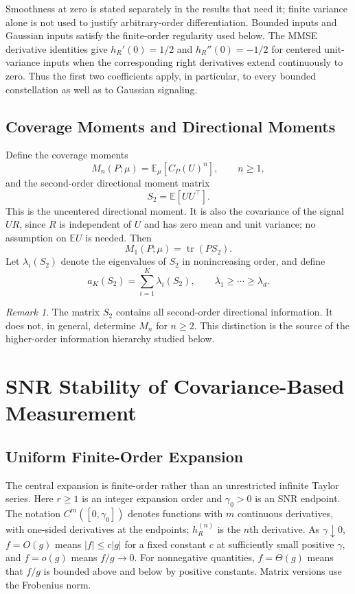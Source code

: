 \documentclass[lettersize,onecolumn]{IEEEtran}
\theoremstyle{remark}
\newtheorem{remark}{Remark}
\theoremstyle{definition}
\newcommand{\EE}{\mathbb E}
\newcommand{\tr}{\operatorname{tr}}
\begin{document}
Smoothness at zero is stated separately in the results that need it; finite variance alone is not used to justify arbitrary-order differentiation. Bounded inputs and Gaussian inputs satisfy the finite-order regularity used below. The MMSE derivative identities \cite{guo2011} give $h_R'(0)=1/2$ and $h_R''(0)=-1/2$ for centered unit-variance inputs when the corresponding right derivatives extend continuously to zero. Thus the first two coefficients apply, in particular, to every bounded constellation as well as to Gaussian signaling.

\subsection{Coverage Moments and Directional Moments}
Define the coverage moments
\begin{equation}
M_n(P;\mu)=\EE_\mu\left[C_P(U)^n\right],
\qquad n\ge1,
\label{eq:Mn}
\end{equation}
and the second-order directional moment matrix
\begin{equation}
S_2=\EE[UU^{\top}].
\label{eq:S2}
\end{equation}
This is the uncentered directional moment. It is also the covariance of the signal $UR$, since $R$ is independent of $U$ and has zero mean and unit variance; no assumption on $\EE U$ is needed.
Then
\begin{equation}
M_1(P;\mu)=\tr(PS_2).
\label{eq:M1}
\end{equation}
Let $\lambda_i(S_2)$ denote the eigenvalues of $S_2$ in nonincreasing order, and define
\begin{equation}
a_K(S_2)=\sum_{i=1}^{K}\lambda_i(S_2),
\qquad \lambda_1\ge\cdots\ge\lambda_d.
\label{eq:aK}
\end{equation}

\begin{remark}
The matrix $S_2$ contains all second-order directional information. It does not, in general, determine $M_n$ for $n\ge2$. This distinction is the source of the higher-order information hierarchy studied below.
\end{remark}

\section{SNR Stability of Covariance-Based Measurement}

\subsection{Uniform Finite-Order Expansion}
The central expansion is finite-order rather than an unrestricted infinite Taylor series. Here $r\ge1$ is an integer expansion order and $\gamma_0>0$ is an SNR endpoint. The notation $C^m([0,\gamma_0])$ denotes functions with $m$ continuous derivatives, with one-sided derivatives at the endpoints; $h_R^{(n)}$ is the $n$th derivative. As $\gamma\downarrow0$, $f=O(g)$ means $|f|\le c|g|$ for a fixed constant $c$ at sufficiently small positive $\gamma$, and $f=o(g)$ means $f/g\to0$. For nonnegative quantities, $f=\Theta(g)$ means that $f/g$ is bounded above and below by positive constants. Matrix versions use the Frobenius norm.
\end{document}
